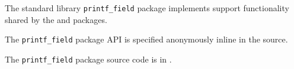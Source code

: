 
The standard library {\tt printf\_field} package implements support functionality shared 
by the  and  packages.

The {\tt printf\_field} package API is specified anonymously inline in the source.

The {\tt printf\_field} package source code is in .

